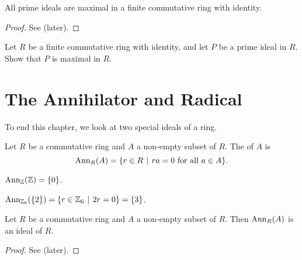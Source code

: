 \begin{corollary}\label{corollary-prime-ideal-is-maximal-in-finite-commutative-ring-with-identity}
    All prime ideals are maximal in a finite commutative ring with identity.
\end{corollary}
\begin{proof}
    See  (later).
\end{proof}
\begin{exercise}\label{exercise-prime-ideal-is-maximal-in-finite-commutative-ring-with-identity}
    Let $R$ be a finite commutative ring with identity, and let $P$ be a prime ideal in $R$. Show that $P$ is maximal in $R$.
\end{exercise}

\section{The Annihilator and Radical}
To end this chapter, we look at two special ideals of a ring.

\begin{definition}
    Let $R$ be a commutative ring and $A$ a non-empty subset of $R$. The  of $A$ is
    \[
        \Ann{R}{A} = \{r \in R \vert ra = 0 \text{ for all } a \in A\}.
    \]
\end{definition}

\begin{example}
    $\mathrm{Ann}_{\mathbb{Z}}(\mathbb{Z}) = \{0\}$.
\end{example}

\begin{example}
    $\Ann{\Z_6}{\{2\}} = \{r \in \Z_6 \vert 2r = 0\} = \{3\}$.
\end{example}

\begin{proposition}
    Let $R$ be a commutative ring and $A$ a non-empty subset of $R$. Then $\mathrm{Ann}_{R}(A)$ is an ideal of $R$.
\end{proposition}
\begin{proof}
    See  (later).
\end{proof}

